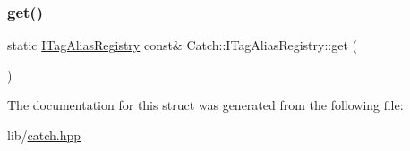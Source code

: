 \hypertarget{struct_catch_1_1_i_tag_alias_registry_aa9d0f008f49473389c7abf6071f137a7}{}\label{struct_catch_1_1_i_tag_alias_registry_aa9d0f008f49473389c7abf6071f137a7} 
\subsubsection{\texorpdfstring{get()}{get()}}
{\footnotesize\ttfamily static \hyperlink{struct_catch_1_1_i_tag_alias_registry}{I\+Tag\+Alias\+Registry} const\& Catch\+::\+I\+Tag\+Alias\+Registry\+::get (\begin{DoxyParamCaption}{ }\end{DoxyParamCaption})\hspace{0.3cm}{\ttfamily [static]}}



The documentation for this struct was generated from the following file\+:\begin{DoxyCompactItemize}
\item 
lib/\hyperlink{catch_8hpp}{catch.\+hpp}\end{DoxyCompactItemize}

